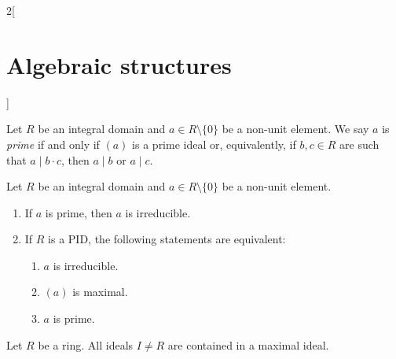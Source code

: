 \documentclass[../../../main.tex]{subfiles}
\begin{document}
\begin{multicols}{2}[\section{Algebraic structures}]
    \begin{definition}
        Let $R$ be an integral domain and $a\in R\setminus\{0\}$ be a non-unit element. We say $a$ is \textit{prime} if and only if $(a)$ is a prime ideal or, equivalently, if $b,c\in R$ are such that $a\mid b\cdot c$, then $a\mid b$ or $a\mid c$.
    \end{definition}
    \begin{prop}
        Let $R$ be an integral domain and $a\in R\setminus\{0\}$ be a non-unit element.
        \begin{enumerate}
            \item If $a$ is prime, then $a$ is irreducible.
            \item If $R$ is a PID, the following statements are equivalent:
                  \begin{enumerate}
                      \item $a$ is irreducible.
                      \item $(a)$ is maximal.
                      \item $a$ is prime.
                  \end{enumerate}
        \end{enumerate}
    \end{prop}
    \begin{theorem}
        Let $R$ be a ring. All ideals $I\ne R$ are contained in a maximal ideal.
    \end{theorem}

\end{multicols}
\end{document}

